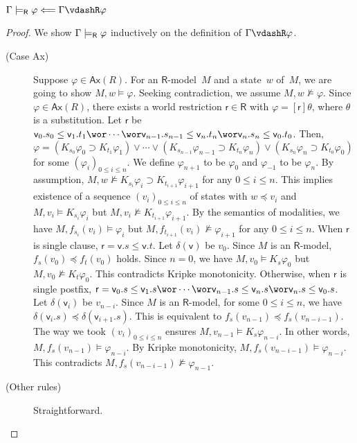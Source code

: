 \documentclass[doctor]{iscs-thesis}
\begin{document}
\begin{lemma}[Soundness]
 $\Gamma\modelsR\varphi\Longleftarrow\Gamma\vdashR\varphi$
\end{lemma}
\begin{proof}
We show $\Gamma\models_{\mathsf R}\varphi$ inductively
on the definition of $\Gamma\vdashR\varphi$.
\begin{description}
 \item[(Case {Ax})]
	    Suppose $\varphi\in \mathsf{Ax}(R)$.
	    For an $\mathsf{R}$-model~$M$ and a state~$w$ of~$M$,
	    we are going to show $M,w\models\varphi$.
	    Seeking contradiction,
	    we assume $M,w\not\models\varphi$.
	    Since $\varphi\in\mathsf{Ax}(R)$, there exists a world
	    restriction $\mathsf r\in\mathsf R$ with
	    $\varphi=[\mathsf r]\theta$,
	    where $\theta$ is a substitution.
	    Let $\mathsf r$ be
	    $\mathsf v_0.s_0\le\mathsf v_1.t_1\wor\cdots\wor
	    \mathsf v_{n-1}.s_{n-1}\le\mathsf v_n.t_n\wor\mathsf
	    v_n.s_n\le\mathsf v_0.t_0$.
	    Then,
	    $\varphi = (K_{s_0}\varphi_0\supset
	    K_{t_1}\varphi_1)\vee\cdots\vee
	    (K_{s_{n-1}}\varphi_{n-1}\supset K_{t_n}\varphi_n)
	    \vee (K_{s_n}\varphi_n\supset K_{t_0}\varphi_0)$
	    for some $(\varphi_i)_{0\le i\le n}$.
	    We define $\varphi_{n+1}$ to be $\varphi_0$ and
	    $\varphi_{-1}$ to be $\varphi_n$.
	    By assumption, $M,w\not\models K_{s_i}\varphi_i\supset
	    K_{t_{i+1}}\varphi_{i+1}$ for any $0\le i\le n$.
	    This implies existence of a sequence
	    $(v_i)_{0\le i\le n}$ of states with $w\preceq v_i$ and
	    $M,v_i\models K_{s_i}\varphi_i$ but $M,v_i\not\models
	    K_{t_{i+1}}\varphi_{i+1}$.
	    By the semantics of modalities, we have
	    $M,f_{s_i}(v_i)\models \varphi_i$ but $M,
	    f_{t_{i+1}}(v_i)\not\models\varphi_{i+1}$
	    for any $0\le i\le n$.
	    When $\mathsf r$ is single clause,
	    $\mathsf r = \mathsf v.s\le\mathsf v.t$.
	    Let $\delta(\mathsf v)$ be $v_0$.
	    Since $M$ is an $\mathsf R$-model,
	    $f_s(v_0)\preceq f_t(v_0)$ holds.
	    Since $n=0$,
	    we have $M,v_0\models K_s\varphi_0$ but $M,v_0\not\models
	    K_t\varphi_0$.
	    This contradicts Kripke monotonicity.
	    Otherwise, when $\mathsf r$ is single postfix,
	    $\mathsf r = \mathsf v_0.s\le\mathsf
	    v_1.s\wor\cdots\wor\mathsf v_{n-1}.s\le\mathsf
	    v_n.s\wor\mathsf v_n.s\le\mathsf v_0.s$.
	    Let $\delta(\mathsf v_i)$ be $v_{n-i}$.
	    Since $M$ is an $\mathsf R$-model,
	    for some $0\le i\le n$,
	    we have $\delta(\mathsf v_i.s)\preceq \delta(\mathsf
	    v_{i+1}.s)$.
	    This is equivalent to $f_s(v_{n-1})\preceq f_s(v_{n-i-1})$.
	    The way we took $(v_i)_{0\le i\le n}$ ensures
	    $M,v_{n-1}\models K_s\varphi_{n-i}$.
	    In other words, $M,f_s(v_{n-1})\models \varphi_{n-i}$.
	    By Kripke monotonicity, $M,f_s(v_{n-i-1})\models
	    \varphi_{n-i}$.
	    This contradicts $M,f_s(v_{n-i-1})\not\models\varphi_{n-1}$.
 \item[(Other rules)]
	    Straightforward.
\end{description}
\end{proof}
\end{document}
